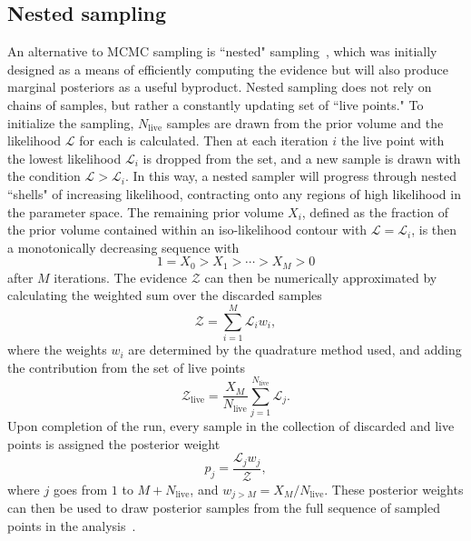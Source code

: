 \subsection{Nested sampling}
An alternative to MCMC sampling is ``nested" sampling~\cite{Skilling:2006,Feroz:2007kg,Speagle_2020}, which was initially designed as a means of efficiently computing the evidence but will also produce marginal posteriors as a useful byproduct.
Nested sampling does not rely on chains of samples, but rather a constantly updating set of ``live points." To initialize the sampling, $N_{\mathrm{live}}$ samples are drawn from the prior volume and the likelihood $\mathcal{L}$ for each is calculated. Then at each iteration $i$ the live point with the lowest likelihood $\mathcal{L}_i$ is dropped from the set, and a new sample is drawn with the condition $\mathcal{L} > \mathcal{L}_i$. In this way, a nested sampler will progress through nested ``shells" of increasing likelihood, contracting onto any regions of high likelihood in the parameter space. The remaining prior volume $X_i$, defined as the fraction of the prior volume contained within an iso-likelihood contour with $\mathcal{L}=\mathcal{L}_i$, is then a monotonically decreasing sequence with
\begin{equation}
    1=X_0>X_1>\cdots>X_M>0
\end{equation}
after $M$ iterations. The evidence $\mathcal{Z}$ can then be numerically approximated by calculating the weighted sum over the discarded samples
\begin{equation}\label{eqn:quadsumev}
    \mathcal{Z} = \sum_{i=1}^{M} \mathcal{L}_{i}w_{i} ,
\end{equation}
where the weights $w_i$ are determined by the quadrature method used, and adding the contribution from the set of live points
\begin{equation}
    \mathcal{Z}_{\mathrm{live}} = \frac{X_M}{N_{\mathrm{live}}} \sum_{j=1}^{N_{\mathrm{live}}} \mathcal{L}_j .
\end{equation}
Upon completion of the run, every sample in the collection of discarded and live points is assigned the posterior weight~\cite{Feroz:2008xx}
\begin{equation}\label{eqn:nestpostweight}
    p_{j} = \frac{\mathcal{L}_{j}w_{j}}{\mathcal{Z}} ,
\end{equation}
where $j$ goes from $1$ to $M+N_{\mathrm{live}}$, and $w_{j>M}=X_M/N_{\mathrm{live}}$.
These posterior weights can then be used to draw posterior samples from the full sequence of sampled points in the analysis~\cite{Feroz:2008xx}.

